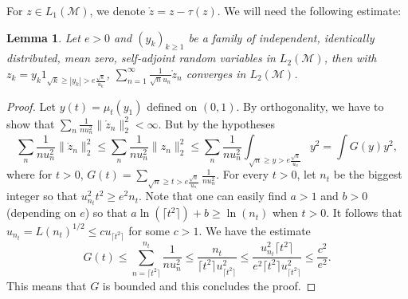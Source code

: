 \documentclass[10pt]{amsart}
\newtheorem{lem}[thm]{Lemma}
\theoremstyle{definition}
\theoremstyle{myremark}
\numberwithin{equation}{section}
\newcommand{\CM}{\mathcal{M}}
\begin{document}
 



  For $z\in L_1(\CM)$, we denote $\mathring z = z-\tau(z)$. We will need the following estimate:

  \begin{lem}\label{calc}
    Let $e>0$ and $(y_k)_{k\geq 1}$ be a family of independent, identically distributed, mean zero,
    self-adjoint random variables in $L_2(\CM)$, then with $z_k=y_k1_{\sqrt k\geq |y_k|>e \frac{ \sqrt k}{u_k}}$, $\sum_{n=1}^\infty \frac 1 {\sqrt n  {u_n}} \mathring z_n$ converges in $L_2(\CM)$.   \end{lem}

  \begin{proof}
   Let $y(t)=\mu_t(y_1)$ defined on $(0,1)$.
    By orthogonality, we have to show that $\sum_n\frac 1 {n  u_n^2} \|\mathring z_n\|_2^2<\infty$. But by the hypotheses
    $$\sum_n\frac 1 {n  u_n^2} \|\mathring z_n\|_2^2\leq \sum_n\frac 1 {n  u_n^2} \|z_n\|_2^2\leq \sum_n\frac 1 {n  u_n^2} \int_{\sqrt n \geq y>e \frac{ \sqrt n}{u_n}} y^2= \int G(y)y^2,$$
    where for $t>0$,
    $G(t)=\sum_{ \sqrt n \geq t> e \frac{ \sqrt n}{u_n}}\frac 1 {n
      u_n^2}$. For every $t>0$, let $n_t$ be the biggest integer so
    that $u_{n_t}^2 t^2 \geq e^2n_t$. Note that one can easily find
    $a>1$ and $b>0$ (depending on $e$) so that $a \ln(\lceil t^2\rceil )+b \geq \ln(n_t)$ when
    $t>0$. It follows that $u_{n_t}= L(n_t)^{1/2}\leq c u_{\lceil t^2\rceil}$
    for some $c>1$.    We have the estimate
    $$G(t)\leq \sum_{n=\lceil t^2\rceil}^{n_t} \frac 1 {nu_n^2}\leq
    \frac{n_t}{\lceil t^2\rceil u_{\lceil t^2\rceil}^2}\leq \frac{u_{n_t}^2 \lceil t^2\rceil}{e^2\lceil t^2\rceil u_{\lceil t^2\rceil}^2}\leq\frac {c^2}{e^2}. $$
    This means that $G$ is bounded and this concludes the proof.    
  \end{proof}
\end{document}
